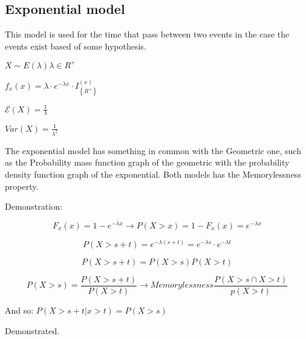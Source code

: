 \documentclass{article}
\begin{document}
\subsection{Exponential model}

This model is used for the time that pass between two events in the case the events exist based of some hypothesis.

$X \sim E(\lambda) \lambda \in R^+$
\bigskip

$f_x(x) = \lambda \cdot e^{- \lambda x} \cdot I_\left\{R^+\right\}^(x)$
\bigskip

$\mathcal E(X) = \frac{1}{\lambda}$

$Var(X) = \frac{1}{\lambda^2}$
\bigskip


The exponential model has something in common with the Geometric one, such as the Probability mass function graph of the geometric with the probability density function graph of the exponential. Both models has the Memorylessness property.
\bigskip

Demonstration:

$$F_x(x) = 1 - e^{-\lambda x} \rightarrow P(X > x) = 1 - F_x(x) = e^{- \lambda x}$$

$$P(X > s + t) = e^{- \lambda (s+t)} = e^{-\lambda s} \cdot e^{- \lambda t}$$

$$P(X > s + t ) = P(X > s)P(X > t)$$

$$P(X>s) = \frac{P(X > s +t )}{P(X > t)} \rightarrow Memorylessness \frac{P(X > s \cap X > t)}{p(X > t)}$$

And so: $P(X > s + t | x > t) = P(X>s)$

Demonstrated.
\end{document}
